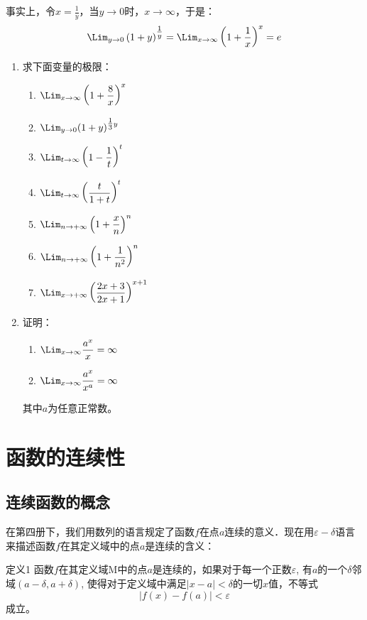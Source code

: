 事实上，令$x=\frac{1}{y}$，当$y\to 0$时，$x\to\infty$，于是：
\[\Lim_{y\to 0}\left(1+y\right)^{\tfrac{1}{y}}=\Lim_{x\to \infty}\left(1+\frac{1}{x}\right)^{x}=e\]

\begin{ex}
\begin{enumerate}
    \item 求下面变量的极限：
\begin{multicols}{2}
\begin{enumerate}
    \item $\Lim_{x\to\infty}\left(1+\frac{8}{x}\right)^x$
    \item $\Lim_{y\to 0}(1+y)^{\tfrac{1}{3}y}$
    \item $\Lim_{t\to\infty}\left(1-\frac{1}{t}\right)^t$
    \item $\Lim_{t\to\infty}\left(\frac{t}{1+t}\right)^t$
    \item $\Lim_{n\to+\infty}\left(1+\frac{x}{n}\right)^n$
    \item $\Lim_{n\to +\infty}\left(1+\frac{1}{n^2}\right)^n$
    \item $\Lim_{x\to+\infty}\left(\frac{2x+3}{2x+1}\right)^{x+1}$
\end{enumerate}
\end{multicols}

\item 证明：
\begin{multicols}{2}
\begin{enumerate}
    \item $\Lim_{x\to\infty}\frac{a^x}{x}=\infty$
    \item $\Lim_{x\to\infty}\frac{a^x}{x^a}=\infty$
\end{enumerate}
\end{multicols}
其中$a$为任意正常数。
\end{enumerate}
\end{ex}

\section{函数的连续性}
\subsection{连续函数的概念}

在第四册下，我们用数列的语言规定了函数$f$在点$a$连续的意义．现在用$\varepsilon-\delta$语言来描述函数$f$在其定义域中的点$a$是连续的含义：

\begin{blk}
   {定义1} 函数$f$在其定义域M中的点$a$是连续的，如果对于每一个正数$\varepsilon$, 有$a$的一个$\delta$邻域$(a-\delta,a+\delta)$, 使得对于定义域中满足$|x-a|<\delta$的一切$x$值，不等式
\[|f (x) -f(a)|<\varepsilon\]
成立。 
\end{blk}

